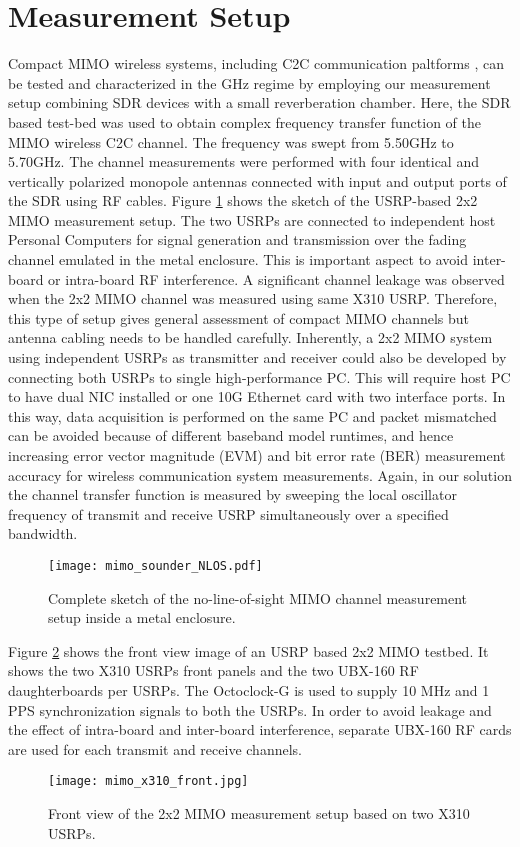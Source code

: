 \documentclass[10pt, final, journal, letterpaper, oneside, twocolumn]{IEEEtran}
\begin{document}
\section{Measurement Setup}
Compact MIMO wireless systems, including C2C communication paltforms \cite{rayess2017antennas}, can be tested and characterized in the GHz regime by employing our measurement setup combining SDR devices with a small reverberation chamber. 
Here, the SDR based test-bed was used to obtain complex frequency transfer function of the MIMO wireless C2C channel. The frequency was swept from 5.50GHz to 5.70GHz. 
The channel measurements were performed with four identical and vertically polarized monopole antennas connected with input and output ports of the SDR using RF cables.
Figure \ref{fig:mimo_sounder_sketch_nlos} shows the sketch of the USRP-based 2x2 MIMO measurement setup. The two USRPs are connected to independent host Personal Computers for signal generation and transmission over the fading channel emulated in the metal enclosure. This is important aspect to avoid inter-board or intra-board RF interference. A significant channel leakage was observed when the 2x2 MIMO channel was measured using same X310 USRP. Therefore, this type of setup gives general assessment of compact MIMO channels but antenna cabling needs to be handled carefully. Inherently, a 2x2 MIMO system using independent USRPs as transmitter and receiver could also be developed by connecting both USRPs to single high-performance PC. This will require host PC to have dual NIC installed or one 10G Ethernet card with two interface ports.  In this way, data acquisition is performed on the same PC and packet mismatched can be avoided because of different baseband model runtimes, and hence increasing error vector magnitude (EVM) and bit error rate (BER) measurement accuracy for wireless communication system measurements. Again, in our solution the channel transfer function is measured by sweeping the local oscillator frequency of transmit and receive USRP simultaneously over a specified bandwidth.
\begin{figure}
    \centering
    \texttt{[image: mimo\_sounder\_NLOS.pdf]}
    \caption{Complete sketch of the no-line-of-sight MIMO channel measurement setup inside a metal enclosure.}
    \label{fig:mimo_sounder_sketch_nlos}
\end{figure}
Figure \ref{fig:mimo_x310_front} shows the front view image of an USRP based 2x2 MIMO testbed. It shows the two X310 USRPs front panels and the two UBX-160 RF daughterboards per USRPs. 
The Octoclock-G is used to supply 10 MHz and 1 PPS synchronization signals to both the USRPs. In order to avoid leakage and the effect of intra-board and inter-board interference, separate UBX-160 RF cards are used for each transmit and receive channels.
\begin{figure}
    \centering
    \texttt{[image: mimo\_x310\_front.jpg]}
    \caption{Front view of the 2x2 MIMO measurement setup based on two X310 USRPs.}
    \label{fig:mimo_x310_front}
\end{figure}
\end{document}

